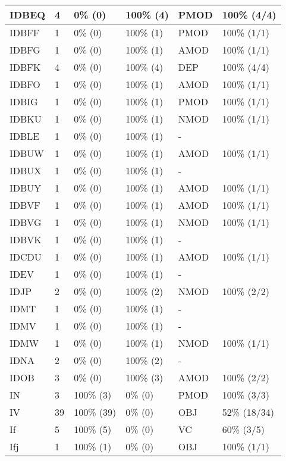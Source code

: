 \begin{figure*}
\begin{tabular}{|l|l|l|l||l|l|}
\hline
 IDBEQ & 4 & 0\% (0) & 100\% (4) & PMOD & 100\% (4/4) \\ 
\hline
 IDBFF & 1 & 0\% (0) & 100\% (1) & PMOD & 100\% (1/1) \\ 
\hline
 IDBFG & 1 & 0\% (0) & 100\% (1) & AMOD & 100\% (1/1) \\ 
\hline
 IDBFK & 4 & 0\% (0) & 100\% (4) & DEP & 100\% (4/4) \\ 
\hline
 IDBFO & 1 & 0\% (0) & 100\% (1) & AMOD & 100\% (1/1) \\ 
\hline
 IDBIG & 1 & 0\% (0) & 100\% (1) & PMOD & 100\% (1/1) \\ 
\hline
 IDBKU & 1 & 0\% (0) & 100\% (1) & NMOD & 100\% (1/1) \\ 
\hline
 IDBLE & 1 & 0\% (0) & 100\% (1) & - &  \\ 
\hline
 IDBUW & 1 & 0\% (0) & 100\% (1) & AMOD & 100\% (1/1) \\ 
\hline
 IDBUX & 1 & 0\% (0) & 100\% (1) & - &  \\ 
\hline
 IDBUY & 1 & 0\% (0) & 100\% (1) & AMOD & 100\% (1/1) \\ 
\hline
 IDBVF & 1 & 0\% (0) & 100\% (1) & AMOD & 100\% (1/1) \\ 
\hline
 IDBVG & 1 & 0\% (0) & 100\% (1) & NMOD & 100\% (1/1) \\ 
\hline
 IDBVK & 1 & 0\% (0) & 100\% (1) & - &  \\ 
\hline
 IDCDU & 1 & 0\% (0) & 100\% (1) & AMOD & 100\% (1/1) \\ 
\hline
 IDEV & 1 & 0\% (0) & 100\% (1) & - &  \\ 
\hline
 IDJP & 2 & 0\% (0) & 100\% (2) & NMOD & 100\% (2/2) \\ 
\hline
 IDMT & 1 & 0\% (0) & 100\% (1) & - &  \\ 
\hline
 IDMV & 1 & 0\% (0) & 100\% (1) & - &  \\ 
\hline
 IDMW & 1 & 0\% (0) & 100\% (1) & NMOD & 100\% (1/1) \\ 
\hline
 IDNA & 2 & 0\% (0) & 100\% (2) & - &  \\ 
\hline
 IDOB & 3 & 0\% (0) & 100\% (3) & AMOD & 100\% (2/2) \\ 
\hline
 IN & 3 & 100\% (3) & 0\% (0) & PMOD & 100\% (3/3) \\ 
\hline
 IV & 39 & 100\% (39) & 0\% (0) & OBJ & 52\% (18/34) \\ 
\hline
 If & 5 & 100\% (5) & 0\% (0) & VC & 60\% (3/5) \\ 
\hline
 Ifj & 1 & 100\% (1) & 0\% (0) & OBJ & 100\% (1/1) \\ 
\hline
\end{tabular}
\end{figure*}
